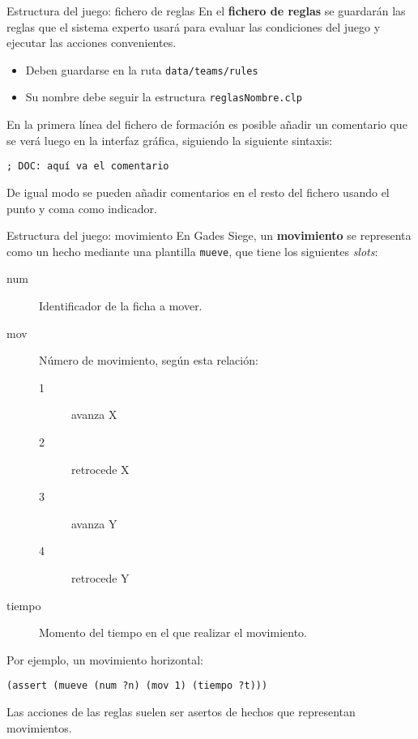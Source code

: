 \documentclass[smaller,spanish,xcolor=svgnames]{beamer}
\begin{document}
\begin{frame}[fragile]{Estructura del juego: fichero de reglas}
  En el \textbf{fichero de reglas} se guardarán las reglas que el sistema
  experto usará para evaluar las condiciones del juego y ejecutar las acciones convenientes.

  \begin{itemize}
  \item Deben guardarse en la ruta \texttt{data/teams/rules}
  \item Su nombre debe seguir la estructura \texttt{reglasNombre.clp}
  \end{itemize}

  \medskip

  En la primera línea del fichero de formación es posible añadir un comentario
  que se verá luego en la interfaz gráfica, siguiendo la siguiente sintaxis:

\begin{verbatim}
; DOC: aquí va el comentario
\end{verbatim}

\medskip

De igual modo se pueden añadir comentarios en el resto del fichero usando el
punto y coma como indicador.
\end{frame}


\begin{frame}[fragile]{Estructura del juego: movimiento}
  En Gades Siege, un \textbf{movimiento} se representa como un hecho mediante
  una plantilla \texttt{mueve}, que tiene los siguientes \textit{slots}:

  \begin{description}
  \item[num] Identificador de la ficha a mover.
  \item[mov] Número de movimiento, según esta relación:
    {\small
    \begin{description}
    \item[1] avanza X
    \item[2] retrocede X
    \item[3] avanza Y
    \item[4] retrocede Y
    \end{description}}
  \item[tiempo] Momento del tiempo en el que realizar el movimiento.
  \end{description}

Por ejemplo, un movimiento horizontal:
\begin{verbatim}
(assert (mueve (num ?n) (mov 1) (tiempo ?t)))
\end{verbatim}

Las acciones de las reglas suelen ser asertos de hechos que representan movimientos.
\end{frame}
\end{document}
